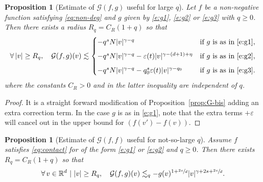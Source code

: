 \documentclass[11pt]{article}
\theoremstyle{plain}
\newtheorem{prop}[thm]{Proposition}
\theoremstyle{definition}
\numberwithin{equation}{section}
\newcommand{\R}{\mathbb R}
\newcommand{\eps}{\varepsilon}
\let\A N
\begin{document}
\begin{prop}[Estimate of {$\mathcal{G}(f,g)$} useful for large
$q$] \label{prop:G-bis2} Let $f$ be a non-negative function satisfying \eqref{eq:non-deg} and $g$
given by \eqref{e:g1}, \eqref{e:g2} or \eqref{e:g3} with $q \ge
0$. Then there exists a radius $R_q = C_R (1+q)$ so that
\[
\forall \, |v| \geq R_q, \quad
\mathcal{G} (f,g)(v)
\lesssim \begin{cases}
- q^s \A |v|^{\gamma-q} & \text{if $g$ is as in \eqref{e:g1}}, \\[2mm]
- q^s \A |v|^{\gamma-q} - \eps(t) |v|^{\gamma-(d+1)+\eta} & \text{if $g$ is as in \eqref{e:g2}}, \\[2mm]
- q^s \A |v|^{\gamma-q} - q_0^s \eps(t) |v|^{\gamma-q_0} & \text{if $g$ is as in \eqref{e:g3}}.
\end{cases}
\]
where the constants $C_R >0$ and in the latter inequality are
independent of $q$.
\end{prop}

\begin{proof} It is a straight forward modification of
Proposition~\ref{prop:G-bis} adding an extra correction term. In the
case $g$ is as in \eqref{e:g1}, note that the extra terms $+\eps$
will cancel out in the upper bound for $(f(v') - f(v))$.
\end{proof}

\begin{prop}[Estimate of {$\mathcal{G}(f,f)$} useful for not-so-large
$q$] \label{prop:G2} Assume $f$ satisfies \eqref{eq:contact} for of
the form \eqref{e:g1} or \eqref{e:g2} and $q \ge 0$. Then there
exists $R_q=C_R(1+q)$ so that
\[ \forall \, v \in \R^d \ | \ |v| \ge R_q, \quad \mathcal{G}
(f,g)(v) \lesssim_q - g(v)^{1+\sfrac{2s}d}
|v|^{\gamma+2s+\sfrac{2s}d}.
\]
\end{prop}
\end{document}
